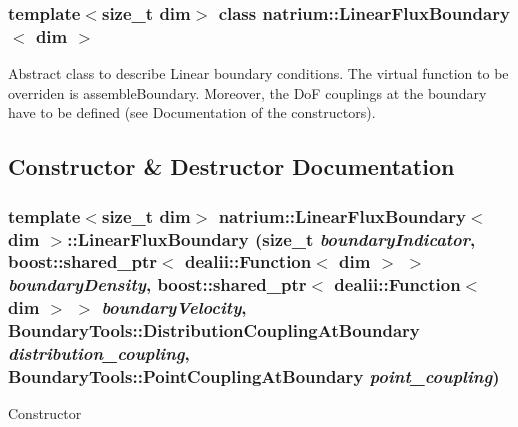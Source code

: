 \subsubsection*{template$<$size\_\-t dim$>$ class natrium::LinearFluxBoundary$<$ dim $>$}

Abstract class to describe Linear boundary conditions. The virtual function to be overriden is assembleBoundary. Moreover, the DoF couplings at the boundary have to be defined (see Documentation of the constructors). 

\subsection{Constructor \& Destructor Documentation}
\hypertarget{classnatrium_1_1LinearFluxBoundary_a11da5c0871a45ec24aa7fa2d0e3843d9}{
\subsubsection[{LinearFluxBoundary}]{\setlength{\rightskip}{0pt plus 5cm}template$<$size\_\-t dim$>$ {\bf natrium::LinearFluxBoundary}$<$ dim $>$::{\bf LinearFluxBoundary} (size\_\-t {\em boundaryIndicator}, \/  boost::shared\_\-ptr$<$ dealii::Function$<$ dim $>$ $>$ {\em boundaryDensity}, \/  boost::shared\_\-ptr$<$ dealii::Function$<$ dim $>$ $>$ {\em boundaryVelocity}, \/  BoundaryTools::DistributionCouplingAtBoundary {\em distribution\_\-coupling}, \/  BoundaryTools::PointCouplingAtBoundary {\em point\_\-coupling})}}
\label{classnatrium_1_1LinearFluxBoundary_a11da5c0871a45ec24aa7fa2d0e3843d9}
Constructor 
